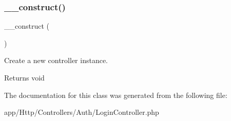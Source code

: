 \subsubsection{\texorpdfstring{\+\_\+\+\_\+construct()}{\_\_construct()}}
{\footnotesize\ttfamily \+\_\+\+\_\+construct (\begin{DoxyParamCaption}{ }\end{DoxyParamCaption})}

Create a new controller instance.

\begin{DoxyReturn}{Returns}
void 
\end{DoxyReturn}


The documentation for this class was generated from the following file\+:\begin{DoxyCompactItemize}
\item 
app/\+Http/\+Controllers/\+Auth/Login\+Controller.\+php\end{DoxyCompactItemize}
